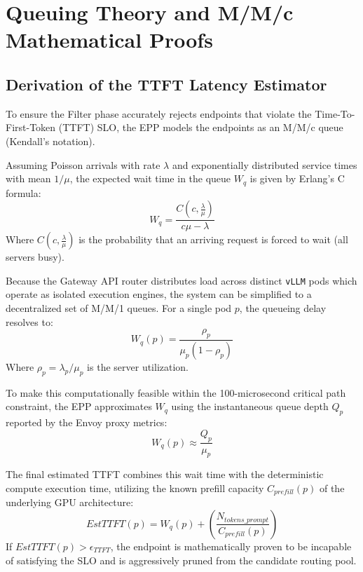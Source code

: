\documentclass[12pt,a4paper,oneside]{report}
\begin{document}
\chapter{Queuing Theory and M/M/c Mathematical Proofs}
\section{Derivation of the TTFT Latency Estimator}
To ensure the Filter phase accurately rejects endpoints that violate the Time-To-First-Token (TTFT) SLO, the EPP models the endpoints as an M/M/c queue (Kendall's notation). 

Assuming Poisson arrivals with rate $\lambda$ and exponentially distributed service times with mean $1/\mu$, the expected wait time in the queue $W_q$ is given by Erlang's C formula:
\begin{equation}
W_q = \frac{C(c, \frac{\lambda}{\mu})}{c\mu - \lambda}
\end{equation}
Where $C(c, \frac{\lambda}{\mu})$ is the probability that an arriving request is forced to wait (all servers busy). 

Because the Gateway API router distributes load across distinct \texttt{vLLM} pods which operate as isolated execution engines, the system can be simplified to a decentralized set of M/M/1 queues. For a single pod $p$, the queueing delay resolves to:
\begin{equation}
W_q(p) = \frac{\rho_p}{\mu_p(1 - \rho_p)}
\end{equation}
Where $\rho_p = \lambda_p / \mu_p$ is the server utilization. 

To make this computationally feasible within the 100-microsecond critical path constraint, the EPP approximates $W_q$ using the instantaneous queue depth $Q_p$ reported by the Envoy proxy metrics:
\begin{equation}
W_q(p) \approx \frac{Q_p}{\mu_p}
\end{equation}

The final estimated TTFT combines this wait time with the deterministic compute execution time, utilizing the known prefill capacity $C_{prefill}(p)$ of the underlying GPU architecture:
\begin{equation}
EstTTFT(p) = W_q(p) + \left( \frac{N_{tokens\_prompt}}{C_{prefill}(p)} \right)
\end{equation}
If $EstTTFT(p) > \epsilon_{TTFT}$, the endpoint is mathematically proven to be incapable of satisfying the SLO and is aggressively pruned from the candidate routing pool.
\end{document}
